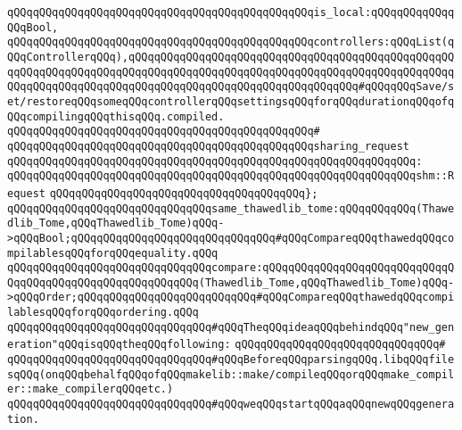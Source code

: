 \newline
\verb|qQQqqQQqqQQqqQQqqQQqqQQqqQQqqQQqqQQqqQQqqQQqqQQqis_local:qQQqqQQqqQQqqQQqBool,|\newline
\verb|qQQqqQQqqQQqqQQqqQQqqQQqqQQqqQQqqQQqqQQqqQQqqQQqcontrollers:qQQqList(qQQqControllerqQQq),qQQqqQQqqQQqqQQqqQQqqQQqqQQqqQQqqQQqqQQqqQQqqQQqqQQqqQQqqQQqqQQqqQQqqQQqqQQqqQQqqQQqqQQqqQQqqQQqqQQqqQQqqQQqqQQqqQQqqQQqqQQqqQQqqQQqqQQqqQQqqQQqqQQqqQQqqQQqqQQqqQQqqQQqqQQqqQQq#qQQqqQQqSave/set/restoreqQQqsomeqQQqcontrollerqQQqsettingsqQQqforqQQqdurationqQQqofqQQqcompilingqQQqthisqQQq.compiled.|\newline
\verb|qQQqqQQqqQQqqQQqqQQqqQQqqQQqqQQqqQQqqQQqqQQqqQQq#|\newline
\verb|qQQqqQQqqQQqqQQqqQQqqQQqqQQqqQQqqQQqqQQqqQQqqQQqsharing_request|\newline
\verb|qQQqqQQqqQQqqQQqqQQqqQQqqQQqqQQqqQQqqQQqqQQqqQQqqQQqqQQqqQQqqQQq:|\newline
\verb|qQQqqQQqqQQqqQQqqQQqqQQqqQQqqQQqqQQqqQQqqQQqqQQqqQQqqQQqqQQqqQQqshm::Request|\newline
\verb|qQQqqQQqqQQqqQQqqQQqqQQqqQQqqQQqqQQqqQQq};|\newline
\newline
\newline
\verb|qQQqqQQqqQQqqQQqqQQqqQQqqQQqqQQqsame_thawedlib_tome:qQQqqQQqqQQq(Thawedlib_Tome,qQQqThawedlib_Tome)qQQq->qQQqBool;qQQqqQQqqQQqqQQqqQQqqQQqqQQqqQQq#qQQqCompareqQQqthawedqQQqcompilablesqQQqforqQQqequality.qQQq|\newline
\verb|qQQqqQQqqQQqqQQqqQQqqQQqqQQqqQQqcompare:qQQqqQQqqQQqqQQqqQQqqQQqqQQqqQQqqQQqqQQqqQQqqQQqqQQqqQQqqQQq(Thawedlib_Tome,qQQqThawedlib_Tome)qQQq->qQQqOrder;qQQqqQQqqQQqqQQqqQQqqQQqqQQq#qQQqCompareqQQqthawedqQQqcompilablesqQQqforqQQqordering.qQQq|\newline
\newline
\newline
\newline
\verb|qQQqqQQqqQQqqQQqqQQqqQQqqQQqqQQq#qQQqTheqQQqideaqQQqbehindqQQq"new_generation"qQQqisqQQqtheqQQqfollowing:|\newline
\verb|qQQqqQQqqQQqqQQqqQQqqQQqqQQqqQQq#|\newline
\verb|qQQqqQQqqQQqqQQqqQQqqQQqqQQqqQQq#qQQqBeforeqQQqparsingqQQq.libqQQqfilesqQQq(onqQQqbehalfqQQqofqQQqmakelib::make/compileqQQqorqQQqmake_compiler::make_compilerqQQqetc.)|\newline
\verb|qQQqqQQqqQQqqQQqqQQqqQQqqQQqqQQq#qQQqweqQQqstartqQQqaqQQqnewqQQqgeneration.|\newline

